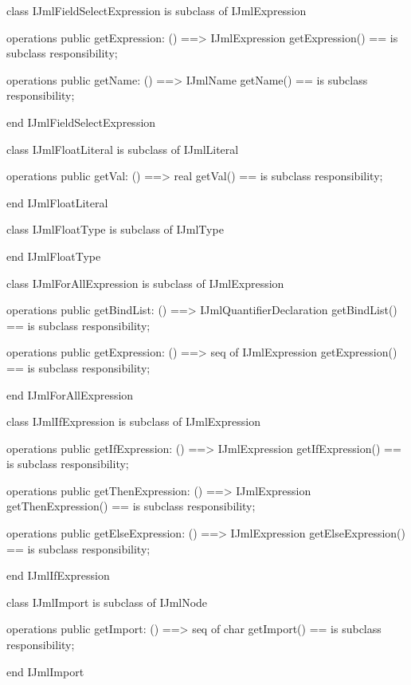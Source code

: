 \begin{vdm_al}
class IJmlFieldSelectExpression
 is subclass of IJmlExpression

operations
  public getExpression: () ==> IJmlExpression
  getExpression() == is subclass responsibility;

operations
  public getName: () ==> IJmlName
  getName() == is subclass responsibility;

end IJmlFieldSelectExpression
\end{vdm_al}

\begin{vdm_al}
class IJmlFloatLiteral
 is subclass of IJmlLiteral

operations
  public getVal: () ==> real
  getVal() == is subclass responsibility;

end IJmlFloatLiteral
\end{vdm_al}

\begin{vdm_al}
class IJmlFloatType
 is subclass of IJmlType

end IJmlFloatType
\end{vdm_al}

\begin{vdm_al}
class IJmlForAllExpression
 is subclass of IJmlExpression

operations
  public getBindList: () ==> IJmlQuantifierDeclaration
  getBindList() == is subclass responsibility;

operations
  public getExpression: () ==> seq of IJmlExpression
  getExpression() == is subclass responsibility;

end IJmlForAllExpression
\end{vdm_al}

\begin{vdm_al}
class IJmlIfExpression
 is subclass of IJmlExpression

operations
  public getIfExpression: () ==> IJmlExpression
  getIfExpression() == is subclass responsibility;

operations
  public getThenExpression: () ==> IJmlExpression
  getThenExpression() == is subclass responsibility;

operations
  public getElseExpression: () ==> IJmlExpression
  getElseExpression() == is subclass responsibility;

end IJmlIfExpression
\end{vdm_al}

\begin{vdm_al}
class IJmlImport
 is subclass of IJmlNode

operations
  public getImport: () ==> seq of char
  getImport() == is subclass responsibility;

end IJmlImport
\end{vdm_al}


